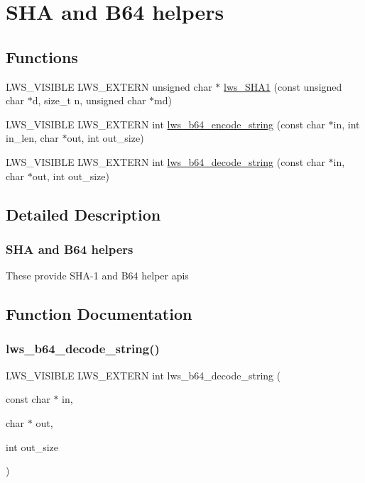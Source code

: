 \hypertarget{group__sha}{}\section{S\+HA and B64 helpers}
\label{group__sha}
\subsection*{Functions}
\begin{DoxyCompactItemize}
\item 
L\+W\+S\+\_\+\+V\+I\+S\+I\+B\+LE L\+W\+S\+\_\+\+E\+X\+T\+E\+RN unsigned char $\ast$ \hyperlink{group__sha_ga7b09ab74646266f0b555103b3bb8dfe5}{lws\+\_\+\+S\+H\+A1} (const unsigned char $\ast$d, size\+\_\+t n, unsigned char $\ast$md)
\item 
L\+W\+S\+\_\+\+V\+I\+S\+I\+B\+LE L\+W\+S\+\_\+\+E\+X\+T\+E\+RN int \hyperlink{group__sha_gaf39765e4a3b413efb65e4698b2ec3575}{lws\+\_\+b64\+\_\+encode\+\_\+string} (const char $\ast$in, int in\+\_\+len, char $\ast$out, int out\+\_\+size)
\item 
L\+W\+S\+\_\+\+V\+I\+S\+I\+B\+LE L\+W\+S\+\_\+\+E\+X\+T\+E\+RN int \hyperlink{group__sha_ga66316e6a5a0644a09d5a10e919dfdd8d}{lws\+\_\+b64\+\_\+decode\+\_\+string} (const char $\ast$in, char $\ast$out, int out\+\_\+size)
\end{DoxyCompactItemize}


\subsection{Detailed Description}
\subsubsection*{S\+HA and B64 helpers}

These provide S\+H\+A-\/1 and B64 helper apis 

\subsection{Function Documentation}
\mbox{\label{group__sha_ga66316e6a5a0644a09d5a10e919dfdd8d}} 
\subsubsection{\texorpdfstring{lws\+\_\+b64\+\_\+decode\+\_\+string()}{lws\_b64\_decode\_string()}}
{\footnotesize\ttfamily L\+W\+S\+\_\+\+V\+I\+S\+I\+B\+LE L\+W\+S\+\_\+\+E\+X\+T\+E\+RN int lws\+\_\+b64\+\_\+decode\+\_\+string (\begin{DoxyParamCaption}\item[{const char $\ast$}]{in,  }\item[{char $\ast$}]{out,  }\item[{int}]{out\+\_\+size }\end{DoxyParamCaption})}

